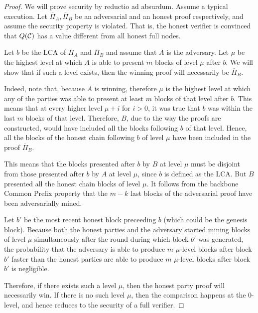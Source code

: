 \begin{proof}
    We will prove security by reductio ad absurdum. Assume a typical execution.
    Let $\overline{\Pi}_A, \overline{\Pi}_B$ be an adversarial and an honest
    proof respectively, and assume the security property is violated. That is,
    the honest verifier is convinced that $Q(\mathcal{C})$ has a value different
    from all honest full nodes.

    Let $b$ be the LCA of $\overline{\Pi}_A$ and $\overline{\Pi}_B$ and assume
    that $A$ is the adversary. Let $\mu$ be the highest level at which $A$
    is able to present $m$ blocks of level $\mu$ after $b$. We will show that
    if such a level exists, then the winning proof will necessarily be
    $\overline{\Pi}_B$.

    Indeed, note that, because $A$ is winning, therefore $\mu$ is the highest
    level at which any of the parties was able to present at least $m$ blocks
    of that level after $b$. This means that at every higher level $\mu + i$
    for $i > 0$, it was true that $b$ was within the last $m$ blocks of that
    level.  Therefore, $B$, due to the way the proofs are constructed, would
    have included all the blocks following $b$ of that level. Hence, all the
    blocks of the honest chain following $b$ of level $\mu$ have been included
    in the proof $\overline{\Pi}_B$.

    This means that the blocks presented after $b$ by $B$ at level $\mu$ must
    be disjoint from those presented after $b$ by $A$ at level $\mu$, since $b$
    is defined as the LCA. But $B$ presented all the honest chain
    blocks of level $\mu$. It follows from the backbone Common Prefix property
    \cite{backbone} that the $m - k$ last blocks of the adversarial proof have
    been adversarially mined.

    Let $b'$ be the most recent honest block preceeding $b$ (which could be the
    genesis block). Because both the honest parties and the adversary started
    mining blocks of level $\mu$ simultaneously after the round during which
    block $b'$ was generated, the probability that the adversary is able to
    produce $m$ $\mu$-level blocks after block $b'$ faster than the honest
    parties are able to produce $m$ $\mu$-level blocks after block $b'$ is
    negligible.

    Therefore, if there exists such a level $\mu$, then the honest party proof
    will necessarily win. If there is no such level $\mu$, then the comparison
    happens at the $0$-level, and hence reduces to the security of a full
    verifier.
\end{proof}

